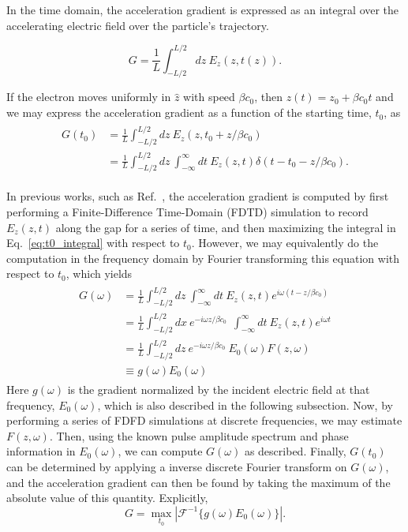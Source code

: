 In the time domain, the acceleration gradient is expressed as an integral over the accelerating electric field over the particle's trajectory.

\begin{equation}
G = \frac{1}{L}\int_{-L/2}^{L/2}dz\ E_z(z, t(z)).
\end{equation}

If the electron moves uniformly in $\hat{z}$ with speed $\beta c_0$, then $z(t) = z_0 + \beta c_0 t$ and we may express the acceleration gradient as a function of the starting time, $t_0$, as
\begin{align}
\begin{split}
G(t_0) &= \frac{1}{L}\int_{-L/2}^{L/2} dz\ E_z(z,t_0 + z/\beta c_0) \\
 &= \frac{1}{L}\int_{-L/2}^{L/2} dz\ \int_{-\infty}^{\infty}dt\ E_z(z,t)\delta(t-t_0- z/\beta c_0).
 \label{eq:t0_integral}
 \end{split}
\end{align}

In previous works, such as Ref.~\cite{plettner2006proposed}, the acceleration gradient is computed by first performing a Finite-Difference Time-Domain (FDTD) simulation to record $E_z(z,t)$ along the gap for a series of time, and then maximizing the integral in Eq.~\ref{eq:t0_integral} with respect to $t_0$. However, we may equivalently do the computation in the frequency domain by Fourier transforming this equation with respect to $t_0$, which yields
\begin{align}
\begin{split}
    G(\omega) &= \frac{1}{L}\int_{-L/2}^{L/2} dz\ \int_{-\infty}^{\infty}dt\ E_z(z,t) e^{i\omega (t - z/\beta c_0)} \\
  &= \frac{1}{L}\int_{-L/2}^{L/2} dx\ e^{-i\omega z/\beta c_0} \ \ \int_{-\infty}^{\infty}dt\ E_z(z,t) e^{i\omega t} \\
  &= \frac{1}{L}\int_{-L/2}^{L/2} dz\ e^{-i\omega z/\beta c_0}\ E_0(\omega) F(z,\omega)\\
  &\equiv g(\omega)E_0(\omega)
  \end{split}
\end{align}
Here $g(\omega)$ is the gradient normalized by the incident electric field at that frequency, $E_0(\omega)$, which is also described in the following subsection. 
Now, by performing a series of FDFD simulations at discrete frequencies, we may estimate $F(z,\omega)$. Then, using the known pulse amplitude spectrum and phase information in $E_0(\omega)$, we can compute $G(\omega)$ as described. Finally, $G(t_0)$ can be determined by applying a inverse discrete Fourier transform on $G(\omega)$, and the acceleration gradient can then be found by taking the maximum of the absolute value of this quantity. Explicitly,
\begin{equation}
    G = \max_{t_0}|\mathcal{F}^{-1}\{ g(\omega) E_0(\omega)\}|.
\end{equation}

